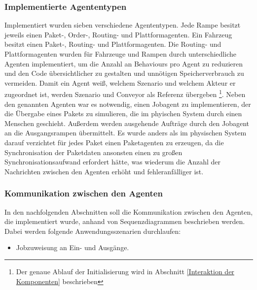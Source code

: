 \subsubsection{Implementierte Agententypen}
Implementiert wurden sieben verschiedene Agententypen. Jede Rampe besitzt jeweils einen Paket-, Order-, Routing- und Plattformagenten. Ein Fahrzeug besitzt einen Paket-, Routing- und Plattformagenten. Die Routing- und Plattformagenten wurden für Fahrzeuge und Rampen durch unterschiedliche Agenten implementiert, um die Anzahl an Behaviours pro Agent zu reduzieren und den Code übersichtlicher zu gestalten und unnötigen Speicherverbrauch zu vermeiden. Damit ein Agent weiß, welchem Szenario und welchem Akteur er zugeordnet ist, werden Szenario und Conveyor als Referenz übergeben \footnote{Der genaue Ablauf der Initialisierung wird in Abschnitt \ref{Interaktion der Komponenten} beschrieben}. Neben den genannten Agenten war es notwendig, einen Jobagent zu implementieren, der die Übergabe eines Pakets zu simulieren, die im phyischen System durch einen Menschen geschieht. Außerdem werden ausgehende Aufträge durch den Jobagent an die Ausgangsrampen übermittelt. Es wurde anders als im physischen System darauf verzichtet für jedes Paket einen Paketagenten zu erzeugen, da die Synchronisation der Paketdaten ansonsten einen zu großen Synchronisationsaufwand erfordert hätte, was wiederum die Anzahl der Nachrichten zwischen den Agenten erhöht und fehleranfälliger ist.
\subsubsection{Kommunikation zwischen den Agenten}
In den nachfolgenden Abschnitten soll die Kommunikation zwischen den Agenten, die implementiert wurde, anhand von Sequenzdiagrammen beschrieben werden. Dabei werden folgende Anwendungsszenarien durchlaufen:
\begin{itemize}
\item Jobzuweisung an Ein- und Ausgänge.
\end{itemize}

